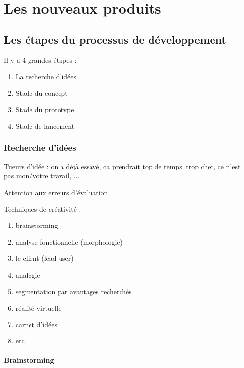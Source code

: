 
\chapter{Les nouveaux produits}
	
	\section{Les étapes du processus de développement}

	
	Il y a 4 grandes étapes :
	
	\begin{enumerate}
		\item La recherche d'idées
		\item Stade du concept
		\item Stade du prototype
		\item Stade de lancement
	\end{enumerate}
	
		\subsection{Recherche d'idées}
		
		Tueurs d'idée : on a déjà essayé, ça prendrait top de temps, trop cher, ce n'est pas mon/votre travail, ...
		
		
		Attention aux erreurs d'évaluation.
		
		
		Techniques de créativité :
		
		\begin{enumerate}
			\item brainstorming
			\item analyse fonctionnelle (morphologie)
			\item le client (lead-user)
			\item analogie
			\item segmentation par avantages recherchés
			\item réalité virtuelle
			\item carnet d'idées
			\item etc
		\end{enumerate}
	
		
			\subsubsection{Brainstorming}
			
